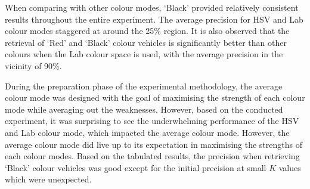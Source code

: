 When comparing with other colour modes, `Black' provided relatively consistent results throughout the entire experiment. The average precision for HSV and Lab colour modes staggered at around the 25\% region. It is also observed that the retrieval of `Red' and `Black' colour vehicles is significantly better than other colours when the Lab colour space is used, with the average precision in the vicinity of 90\%.

During the preparation phase of the experimental methodology, the average colour mode was designed with the goal of maximising the strength of each colour mode while averaging out the weaknesses. However, based on the conducted experiment, it was surprising to see the underwhelming performance of the HSV and Lab colour mode, which impacted the average colour mode. %
However, the average colour mode did live up to its expectation in maximising the strengths of each colour modes. Based on the tabulated results, the precision when retrieving `Black' colour vehicles was good except for the initial precision at small $K$ values which were unexpected.

